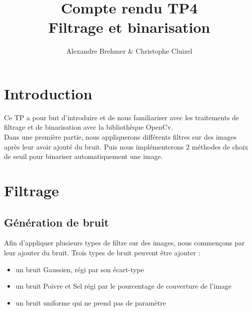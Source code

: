 \documentclass{article}
\title{Compte rendu TP4 \\ Filtrage et binarisation}
\author{Alexandre Brehmer \& Christophe Cluizel}
\begin{document}
 \maketitle
 \tableofcontents
 \newpage

 
 \section{Introduction}
 Ce TP a pour but d'introduire et de nous familiariser avec les traitements de filtrage et de binarisation avec la bibliothèque OpenCv.\\
 
 Dans une première partie, nous appliquerons différents filtres sur des images après leur avoir ajouté du bruit. Puis nous implémenterons 2 méthodes de choix de seuil pour binariser automatiquement une image. 
 
 \section{Filtrage}

 \subsection{Génération de bruit}
 Afin d'appliquer plusieurs types de filtre sur des images, nous commençons par leur ajouter du bruit. Trois types de bruit peuvent être ajouter :
 \begin{itemize}
 	\item un bruit Gaussien, régi par son écart-type
 	\item un bruit Poivre et Sel régi par le pourcentage de couverture de l'image
 	\item un bruit uniforme qui ne prend pas de paramètre
 \end{itemize}
\end{document}
